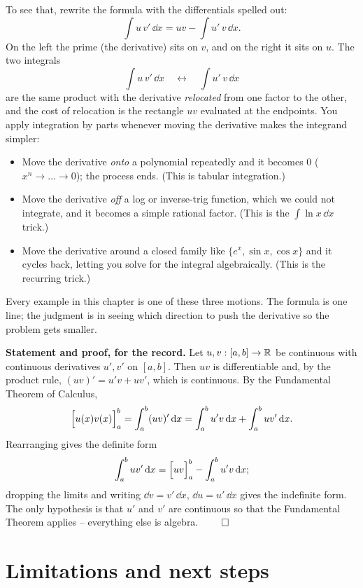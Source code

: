 To see that, rewrite the formula with the differentials spelled out:
\[
\int u\,v'\,\dd x = uv - \int u'\,v\,\dd x.
\]
On the left the prime (the derivative) sits on $v$, and on the right it sits on
$u$. The two
integrals
\[
\int u\,v'\,\dd x \quad\longleftrightarrow\quad \int u'\,v\,\dd x
\]
are the same product with the derivative \emph{relocated} from one factor to the
other, and the cost of relocation is the rectangle $uv$ evaluated at the
endpoints. You apply integration by parts whenever moving the
derivative makes the integrand simpler:
\begin{itemize}
\item Move the derivative \emph{onto} a polynomial repeatedly and it becomes
$0$ ($x^n \to \dots \to 0$); the process ends. (This is tabular integration.)
\item Move the derivative \emph{off} a log or inverse-trig function, which we
could not integrate, and it becomes a simple rational factor. (This is
the $\int\ln x\,\dd x$ trick.)
\item Move the derivative around a closed family like $\{e^x,\sin x,\cos x\}$ and
it cycles back, letting you solve for the integral algebraically. (This is the
recurring trick.)
\end{itemize}
Every example in this chapter is one of these three motions. The formula is one
line; the judgment is in seeing which direction to push the derivative so the
problem gets smaller.

\begin{formalbox}
\textbf{Statement and proof, for the record.} Let $u,v:[a,b]\to\mathbb{R}$ be continuous
with continuous derivatives $u',v'$ on $[a,b]$. Then $uv$ is differentiable and,
by the product rule, $(uv)' = u'v + uv'$, which is continuous. By the Fundamental
Theorem of Calculus,
\[
\Big[u(x)v(x)\Big]_{a}^{b} = \int_a^b (uv)'\,\mathrm{d} x = \int_a^b u'v\,\mathrm{d} x + \int_a^b uv'\,\mathrm{d} x.
\]
Rearranging gives the definite form
\[
\int_a^b uv'\,\mathrm{d} x = \Big[uv\Big]_{a}^{b} - \int_a^b u'v\,\mathrm{d} x;
\]
dropping the
limits and writing $\dd v = v'\,\dd x$, $\dd u = u'\,\dd x$ gives the indefinite
form. The only hypothesis is that $u'$ and $v'$ are continuous so that the
Fundamental Theorem applies -- everything else is algebra. $\qed$
\end{formalbox}

\section{Limitations and next steps}

